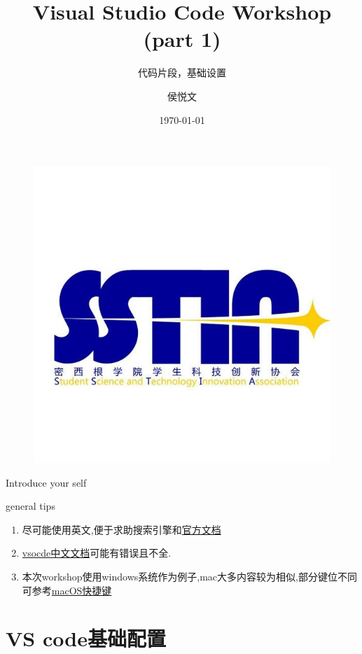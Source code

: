 \documentclass{beamer}
\author{侯悦文}
\title{Visual Studio Code Workshop (part 1)}
\subtitle{代码片段，基础设置}
\institute [SSTIA] {SSTIA}
\date{\today}
\begin{document}
\begin{frame}
    \titlepage
    \begin{figure}[htpb]
        \begin{center}
            \includegraphics[width=0.3\linewidth]{pic/logo.jpg}
        \end{center}
    \end{figure}
    \begin{note}
        {Introduce your self}
    \end{note}

\end{frame}

\begin{frame}
    \tableofcontents[sectionstyle=show,subsectionstyle=show/shaded/hide,subsubsectionstyle=show/shaded/hide]
\end{frame}

\begin{frame}{general tips}
    \begin{enumerate}
        \item 尽可能使用英文,便于求助搜索引擎和\href{https://code.visualstudio.com/docs\#VS code}{官方文档}
        \item \href{https://jeasonstudio.gitbooks.io/vscode-cn-doc/content/}{vsocde中文文档}可能有错误且不全.
        \item 本次workshop使用windows系统作为例子,mac大多内容较为相似,部分键位不同可参考\href{https://code.visualstudio.com/shortcuts/keyboard-shortcuts-macos.pdf}{macOS快捷键}
    \end{enumerate}
\end{frame}

\section{VS code基础配置}
\end{document}
